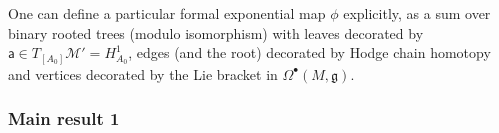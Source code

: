 \documentclass[11pt,a4paper]{amsart}
\theoremstyle{plain} %
\theoremstyle{definition}
\theoremstyle{remark}
\newcommand{\g}{\mathfrak{g}}
\newcommand{\sfa}{\mathsf{a}}
\newcommand{\bt}{\bullet}
\newcommand{\M}{\mathcal{M}}
\begin{document}
One can define a particular formal exponential map $\phi$ explicitly, as a sum over binary rooted trees (modulo isomorphism) with leaves decorated by $\sfa\in T_{[A_0]}\M'=H^1_{A_0}$, edges (and the root) decorated by Hodge chain homotopy 
and vertices decorated by the Lie bracket in $\Omega^\bt(M,\g)$.

\subsubsection{Main result 1}
\end{document}
